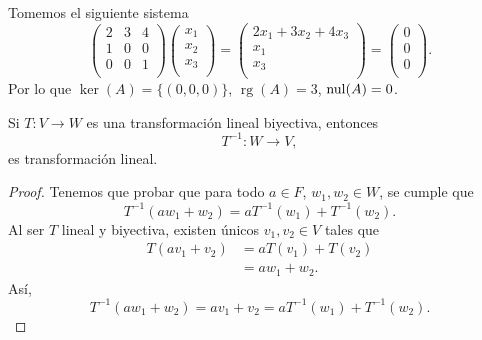 \documentclass[12pt,a4paper]{book}
\newcommand{\rg}{\operatorname{rg}}
\newcommand{\llaves}[1]{\{#1\}}
\begin{document}
    \begin{ejemplo}
    \label{ej:28}
        Tomemos el siguiente sistema
        \begin{equation*}
            \begin{pmatrix}
                2 & 3 & 4\\
                1 & 0 & 0\\
                0 & 0 & 1\\
            \end{pmatrix}
            \begin{pmatrix}
                x_{1}\\
                x_{2}\\
                x_{3}\\
            \end{pmatrix}
            =
            \begin{pmatrix}
                2x_{1} + 3x_{2} + 4x_{3}\\
                x_{1}\\
                x_{3}\\
            \end{pmatrix}
            =
            \begin{pmatrix}
                0\\
                0\\
                0\\
            \end{pmatrix}.
        \end{equation*}
        Por lo que $\ker(A) = \llaves{(0, 0, 0)}$, $\rg(A) = 3$, $\operatorname{nul}(A) = 0$.
    \end{ejemplo}

    \begin{proposicion}
    \label{prop:28}
        Si $T:V \to W$ es una transformación lineal biyectiva, entonces
        \begin{equation*}
            T^{-1}:W\to V,
        \end{equation*}
        es transformación lineal.
    \end{proposicion}

    \begin{proof}
        Tenemos que probar que para todo $a \in F$, $w_{1}, w_{2} \in W$, se cumple que
        \begin{equation*}
            T^{-1}(aw_{1} + w_{2}) = a T^{-1}(w_{1}) + T^{-1}(w_{2}).
        \end{equation*}
        Al ser $T$ lineal y biyectiva, existen únicos $v_{1}, v_{2} \in V$ tales que
        \begin{align*}
            T(av_{1} + v_{2}) & = aT(v_{1}) + T(v_{2})\\
            & = aw_{1} + w_{2}.
        \end{align*}
        Así,
        \begin{equation*}
            T^{-1}(aw_{1} + w_{2}) = av_{1} + v_{2} = aT^{-1}(w_{1})  + T^{-1}(w_{2}).
        \end{equation*}
    \end{proof}
\end{document}
